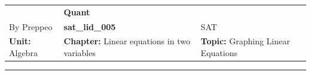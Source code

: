 \documentclass[11pt,paper=a4,answers]{exam}
\begin{document}
\begin{center}
    \centering
    \renewcommand{\arraystretch}{1.5}
    \begin{tabularx}{\textwidth}{YYY}
    & \normalsize\bf{{\Large{{Quant}}}} & \\
    By Preppeo & \normalsize\bf{{sat\_lid\_005}} & SAT\\
    \normalsize{{\textbf{{Unit:}} Algebra}} & \normalsize{{\textbf{{Chapter:}} Linear equations in two variables}} & \normalsize{{\textbf{{Topic:}} Graphing Linear Equations}} \\
    \end{tabularx}
\end{center}
\par\noindent\rule{\textwidth}{1pt}
\end{document}
